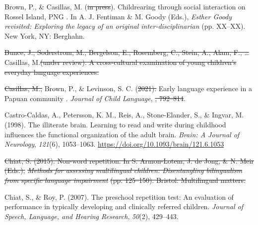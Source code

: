 \documentclass[english,,man,floatsintext]{apa6} %
\providecommand{\DIFaddtex}[1]{{\protect\color{blue}\uwave{#1}}} %
\providecommand{\DIFdeltex}[1]{{\protect\color{red}\sout{#1}}}                      %
\providecommand{\DIFaddbegin}{} %
\providecommand{\DIFaddend}{} %
\providecommand{\DIFdelbegin}{} %
\providecommand{\DIFdelend}{} %
\providecommand{\DIFadd}[1]{\texorpdfstring{\DIFaddtex{#1}}{#1}} %
\providecommand{\DIFdel}[1]{\texorpdfstring{\DIFdeltex{#1}}{}} %
\newcommand{\DIFscaledelfig}{0.5}
\newlength{\DIFdelgraphicswidth} %
\newlength{\DIFdelgraphicsheight} %
\newcommand{\DIFaddincludegraphics}[2][]{{\color{blue}\fbox{\DIFOincludegraphics[#1]{#2}}}} %
\newcommand{\DIFdelincludegraphics}[2][]{%
	\sbox{\DIFdelgraphicsbox}{\DIFOincludegraphics[#1]{#2}}%
	\settoboxwidth{\DIFdelgraphicswidth}{\DIFdelgraphicsbox} %
	\settoboxtotalheight{\DIFdelgraphicsheight}{\DIFdelgraphicsbox} %
	\scalebox{\DIFscaledelfig}{%
		\parbox[b]{\DIFdelgraphicswidth}{\usebox{\DIFdelgraphicsbox}\\[-\baselineskip] \rule{\DIFdelgraphicswidth}{0em}}\llap{\resizebox{\DIFdelgraphicswidth}{\DIFdelgraphicsheight}{%
				\setlength{\unitlength}{\DIFdelgraphicswidth}%
				\begin{picture}(1,1)%
				\thicklines\linethickness{2pt} %
				{\color[rgb]{1,0,0}\put(0,0){\framebox(1,1){}}}%
				{\color[rgb]{1,0,0}\put(0,0){\line( 1,1){1}}}%
				{\color[rgb]{1,0,0}\put(0,1){\line(1,-1){1}}}%
				\end{picture}%
			}\hspace*{3pt}}} %
} %
\DeclareRobustCommand{\DIFaddbegin}{\DIFOaddbegin \let\includegraphics\DIFaddincludegraphics} %
\DeclareRobustCommand{\DIFaddend}{\DIFOaddend \let\includegraphics\DIFOincludegraphics} %
\DeclareRobustCommand{\DIFdelbegin}{\DIFOdelbegin \let\includegraphics\DIFdelincludegraphics} %
\DeclareRobustCommand{\DIFdelend}{\DIFOaddend \let\includegraphics\DIFOincludegraphics} %
\begin{document}
\leavevmode\hypertarget{ref-brownIPchildrearing}{}%
Brown, P., \& Casillas, M. (\DIFdelbegin \DIFdel{in press}\DIFdelend \DIFaddbegin \DIFadd{n.d.}\DIFaddend ). Childrearing through social interaction on \DIFdelbegin %
\DIFdelend Rossel Island, PNG\DIFdelbegin %
\DIFdelend . In A. J. Fentiman \& M. Goody (Eds.), \emph{\DIFdelbegin %
	\DIFdelend Esther Goody \DIFdelbegin %
	\DIFdelend revisited: Exploring the legacy of an original inter-disciplinarian} (pp. XX--XX). New York, NY: Berghahn.

\leavevmode\DIFdelbegin %
\DIFdelend \DIFaddbegin \hypertarget{ref-casillas2020early}{}\DIFaddend %
\DIFdelbegin \DIFdel{Bunce, J., Soderstrom, M., Bergelson, E., Rosemberg, C., Stein, A., Alam, F., \ldots{} }\DIFdelend Casillas, M.\DIFdelbegin \DIFdel{(under review). A cross-cultural examination of young children's everyday language experiences.
}%

\DIFdel{Casillas, M., }\DIFdelend \DIFaddbegin \DIFadd{, }\DIFaddend Brown, P., \& Levinson, S. C. (\DIFdelbegin \DIFdel{2021). }%
\DIFdelend \DIFaddbegin \DIFadd{2020). }\DIFaddend Early language experience in a Papuan community\DIFdelbegin %
\DIFdelend . \emph{Journal of Child Language}, \DIFdelbegin %
\DIFdel{, 792--814}\DIFdelend \DIFaddbegin \emph{\DIFadd{XX}}\DIFadd{, XX--XX}\DIFaddend .

\leavevmode\hypertarget{ref-castro1998illiterate}{}%
Castro-Caldas, A., Petersson, K. M., Reis, A., Stone-Elander, S., \& Ingvar, M. (1998). \DIFdelbegin %
\DIFdelend The illiterate brain. Learning to read and write during childhood influences the functional organization of the adult brain. \DIFdelbegin %
\DIFdelend \emph{Brain: A Journal of Neurology}, \emph{121}(6), 1053--1063. \url{https://doi.org/10.1093/brain/121.6.1053}

\leavevmode\DIFdelbegin %
\DIFdel{Chiat, S. (2015). Non-word repetition. In S. Armon-Lotem, J. de Jong, \& N. Meir (Eds.), }\emph{\DIFdel{Methods for assessing multilingual children: Disentangling bilingualism from specific language impairment}} %
\DIFdel{(pp. 125--150). Bristol: Multilingual matters.
}%

\DIFdelend \hypertarget{ref-chiat2007preschool}{}%
Chiat, S., \& Roy, P. (2007). The preschool repetition test: An evaluation of performance in typically developing and clinically referred children. \emph{Journal of Speech, Language, and Hearing Research}, \emph{50}(2), 429--443.
\end{document}
